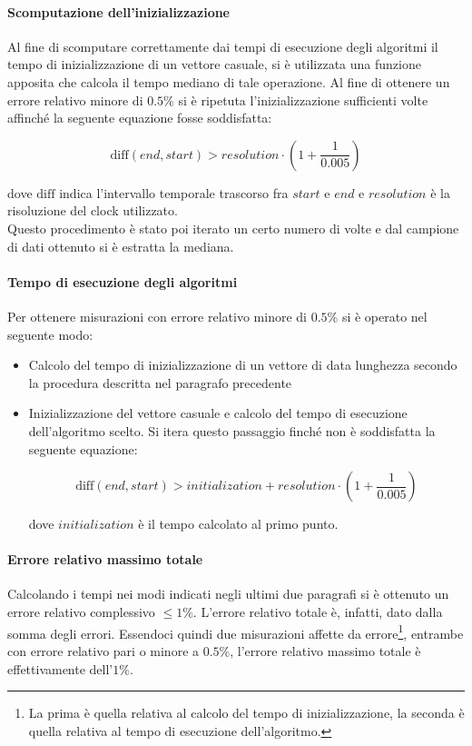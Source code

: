 \documentclass{article}
\begin{document}
	\paragraph{Scomputazione dell'inizializzazione}
	Al fine di scomputare correttamente dai tempi di esecuzione degli algoritmi il tempo di inizializzazione di un vettore casuale, si è utilizzata una funzione apposita che calcola il tempo mediano di tale operazione. Al fine di ottenere un errore relativo minore di $0.5\%$ si è ripetuta l'inizializzazione sufficienti volte affinché la seguente equazione fosse soddisfatta:
	
	\[
		\text{diff}\left(end, start\right) > resolution \cdot \left(1+\frac{1}{0.005}\right)  
	\]
	
	dove $\text{diff}$ indica l'intervallo temporale trascorso fra $start$ e $end$ e $resolution$ è la risoluzione del clock utilizzato. \\ Questo procedimento è stato poi iterato un certo numero di volte e dal campione di dati ottenuto si è estratta la mediana.
	
	\paragraph{Tempo di esecuzione degli algoritmi}
	Per ottenere misurazioni con errore relativo minore di $0.5\%$ si è operato nel seguente modo:
	
	\begin{itemize}
		\item Calcolo del tempo di inizializzazione di un vettore di data lunghezza secondo la procedura descritta nel paragrafo precedente
		\item Inizializzazione del vettore casuale e calcolo del tempo di esecuzione dell'algoritmo scelto. Si itera questo passaggio finché non è soddisfatta la seguente equazione:
		
			\[
				\text{diff}\left(end, start\right) > initialization + resolution \cdot \left(1+\frac{1}{0.005}\right)  
			\]
			
			dove $initialization$ è il tempo calcolato al primo punto.
	\end{itemize}
	
	\newpage
	
	\paragraph{Errore relativo massimo totale}
	Calcolando i tempi nei modi indicati negli ultimi due paragrafi si è ottenuto un errore relativo complessivo $\leq1\%$. L'errore relativo totale è, infatti, dato dalla somma degli errori. Essendoci quindi due misurazioni affette da errore\footnote{La prima è quella relativa al calcolo del tempo di inizializzazione, la seconda è quella relativa al tempo di esecuzione dell'algoritmo.}, entrambe con errore relativo pari o minore a $0.5\%$, l'errore relativo massimo totale è effettivamente dell'$1\%$.
	
\end{document}
